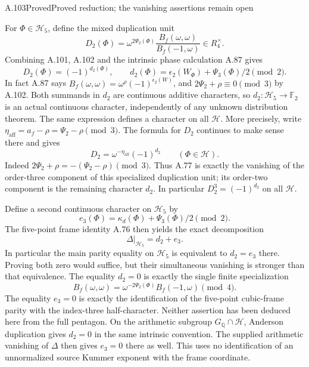 \begin{statement}{A.103}{Proved}{Proved reduction; the vanishing assertions remain open}
\end{statement}
For $\Phi\in\mathcal H_5$, define the mixed duplication unit
\[
 D_2(\Phi)=
 \omega^{2\Psi_2(\Phi)}
       \frac{B_f(\omega,\omega)}{B_f(-1,\omega)}\in R_4^\times.
 \tag{MD.4a}
\]
Combining A.101, A.102 and the intrinsic phase calculation A.87 gives
\[
 \boxed{\quad
 D_2(\Phi)=(-1)^{d_2(\Phi)},\qquad
 d_2(\Phi)=\epsilon_2(W_\Phi)+\Psi_3(\Phi)/2\pmod2.
 \quad}
 \tag{MD.4b}
\]
In fact A.87 says
$B_f(\omega,\omega)=\omega^\rho(-1)^{\epsilon_2(W)}$,
and $2\Psi_2+\rho\equiv0\pmod3$ by A.102.
Both summands in $d_2$ are continuous additive characters, so
$d_2:\mathcal H_5\to\mathbb F_2$ is an actual continuous
character, independently of any unknown distribution theorem.
The same expression defines a character on all $\mathcal H$.
More precisely, write
$\eta_{\mathrm{aff}}=a_f-\rho=\Psi_2-\rho\pmod3$.
The formula for $D_2$ continues to make sense there and gives
\[
 D_2=\omega^{-\eta_{\mathrm{aff}}}(-1)^{d_2}
 \qquad(\Phi\in\mathcal H).
 \tag{MD.4b$'$}
\]
Indeed $2\Psi_2+\rho=-(\Psi_2-\rho)\pmod3$.
Thus A.77 is exactly the vanishing of the order-three component
of this specialized duplication unit; its order-two component is
the remaining character $d_2$. In particular $D_2^3=(-1)^{d_2}$
on all $\mathcal H$.

Define a second continuous character on $\mathcal H_5$ by
\[
 e_3(\Phi)=\kappa_d(\Phi)+\Psi_3(\Phi)/2\pmod2.
 \tag{MD.4c}
\]
The five-point frame identity A.76 then yields the exact decomposition
\[
 \boxed{\quad\Delta|_{\mathcal H_5}=d_2+e_3.\quad}
 \tag{MD.4d}
\]
In particular the main parity equality on $\mathcal H_5$ is
equivalent to $d_2=e_3$ there. Proving both zero would suffice,
but their simultaneous vanishing is stronger than that equivalence.
The equality $d_2=0$ is exactly the single finite specialization
\[
 B_f(\omega,\omega)
       =\omega^{-2\Psi_2(\Phi)}B_f(-1,\omega)\pmod4.
 \tag{MD.4e}
\]
The equality $e_3=0$ is exactly the identification of the
five-point cubic-frame parity with the index-three half-character.
Neither assertion has been deduced here from the full pentagon.
On the arithmetic subgroup $G_{\mathbb Q}\cap\mathcal H$,
Anderson duplication gives $d_2=0$ in the same intrinsic
convention. The supplied arithmetic vanishing of $\Delta$
then gives $e_3=0$ there as well. This uses no identification
of an unnormalized source Kummer exponent with the frame coordinate.

